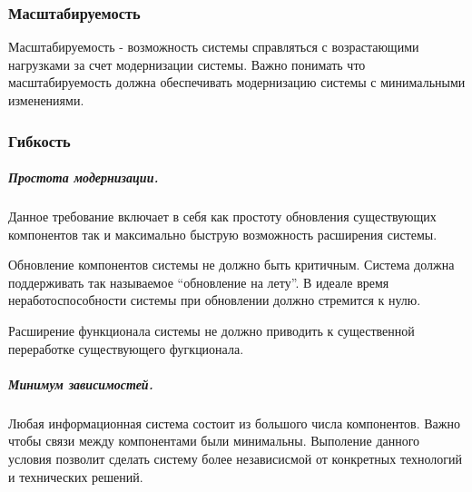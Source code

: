 \subsubsection{Масштабируемость}
Масштабируемость - возможность системы справляться с возрастающими нагрузками за
счет модернизации системы. Важно понимать что масштабируемость должна
обеспечивать модернизацию системы с минимальными изменениями.

\subsubsection{Гибкость}
\subparagraph{Простота модернизации.}
Данное требование включает в себя как простоту обновления существующих
компонентов так и максимально быструю возможность расширения системы.

Обновление компонентов системы не должно быть критичным. Система должна
поддерживать так называемое “обновление на лету”. В идеале время неработоспособности системы при обновлении должно стремится к нулю.

Расширение функционала системы не должно приводить к существенной переработке
существующего фугкционала.

\subparagraph{Минимум зависимостей.}
Любая информационная система состоит из большого числа компонентов. Важно чтобы
связи между компонентами были минимальны. Выполение данного условия позволит
сделать систему более независисмой от конкретных технологий и технических
решений.